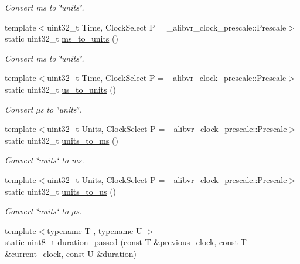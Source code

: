 \begin{DoxyCompactItemize}
\begin{DoxyCompactList}\small\item\em Convert ms to \char`\"{}units\char`\"{}. \end{DoxyCompactList}\item 
{\footnotesize template$<$uint32\+\_\+t Time, Clock\+Select P = \+\_\+alibvr\+\_\+clock\+\_\+prescale\+::\+Prescale$>$ }\\static uint32\+\_\+t \hyperlink{namespaceclock_a07c3289d478f0b0d10f336d863757f08}{ms\+\_\+to\+\_\+units} ()
\begin{DoxyCompactList}\small\item\em Convert ms to \char`\"{}units\char`\"{}. \end{DoxyCompactList}\item 
{\footnotesize template$<$uint32\+\_\+t Time, Clock\+Select P = \+\_\+alibvr\+\_\+clock\+\_\+prescale\+::\+Prescale$>$ }\\static uint32\+\_\+t \hyperlink{namespaceclock_aa4c5b29041788b9162d9ce44ec0777fb}{us\+\_\+to\+\_\+units} ()
\begin{DoxyCompactList}\small\item\em Convert µs to \char`\"{}units\char`\"{}. \end{DoxyCompactList}\item 
{\footnotesize template$<$uint32\+\_\+t Units, Clock\+Select P = \+\_\+alibvr\+\_\+clock\+\_\+prescale\+::\+Prescale$>$ }\\static uint32\+\_\+t \hyperlink{namespaceclock_a47af3a8ffbea7eb40a79905155e751d3}{units\+\_\+to\+\_\+ms} ()
\begin{DoxyCompactList}\small\item\em Convert \char`\"{}units\char`\"{} to ms. \end{DoxyCompactList}\item 
{\footnotesize template$<$uint32\+\_\+t Units, Clock\+Select P = \+\_\+alibvr\+\_\+clock\+\_\+prescale\+::\+Prescale$>$ }\\static uint32\+\_\+t \hyperlink{namespaceclock_af359b2b647bef46d5b5afa640817ce80}{units\+\_\+to\+\_\+us} ()
\begin{DoxyCompactList}\small\item\em Convert \char`\"{}units\char`\"{} to µs. \end{DoxyCompactList}\item 
{\footnotesize template$<$typename T , typename U $>$ }\\static uint8\+\_\+t \hyperlink{namespaceclock_ab9b794523b696e33f46f8d7b98cfee0d}{duration\+\_\+passed} (const T \&previous\+\_\+clock, const T \&current\+\_\+clock, const U \&duration)

\end{DoxyCompactItemize}
